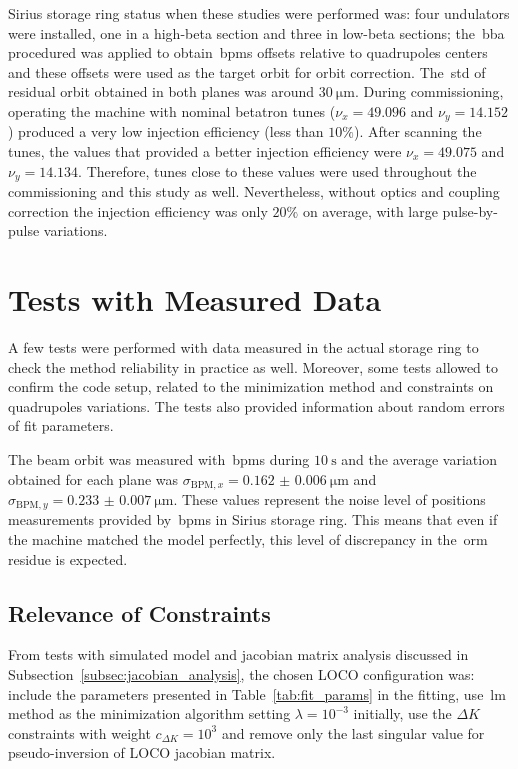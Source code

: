 Sirius storage ring status when these studies were performed was: four undulators were installed, one in a high-beta section and three in low-beta sections; the~\gls{bba} procedured was applied to obtain~\glspl{bpm} offsets relative to quadrupoles centers and these offsets were used as the target orbit for orbit correction. The~\gls{std} of residual orbit obtained in both planes was around $\SI{30}{\micro\meter}$. During commissioning, operating the machine with nominal betatron tunes ($\nu_x = 49.096$ and $\nu_y = 14.152$) produced a very low injection efficiency (less than $10\%$). After scanning the tunes, the values that provided a better injection efficiency were $\nu_x = 49.075$ and $\nu_y = 14.134$. Therefore, tunes close to these values were used throughout the commissioning and this study as well. Nevertheless, without optics and coupling correction the injection efficiency was only $20\%$ on average, with large pulse-by-pulse variations.
\section{Tests with Measured Data}\label{sec:tests_measured}
A few tests were performed with data measured in the actual storage ring to check the method reliability in practice as well. Moreover, some tests allowed to confirm the code setup, related to the minimization method and constraints on quadrupoles variations. The tests also provided information about random errors of fit parameters.

The beam orbit was measured with~\glspl{bpm} during $\SI{10}{\second}$ and the average variation obtained for each plane was $\sigma_{\mathrm{BPM}, x} = \SI{0.162(6)}{\micro\meter}$ and $\sigma_{\mathrm{BPM}, y} = \SI{0.233(7)}{\micro\meter}$. These values represent the noise level of positions measurements provided by~\glspl{bpm} in Sirius storage ring. This means that even if the machine matched the model perfectly, this level of discrepancy in the~\gls{orm} residue is expected.

\subsection{Relevance of Constraints}\label{subsec:loco_config}
From tests with simulated model and jacobian matrix analysis discussed in Subsection~\ref{subsec:jacobian_analysis}, the chosen LOCO configuration was: include the parameters presented in Table~\ref{tab:fit_params} in the fitting, use~\gls{lm} method as the minimization algorithm setting $\lambda = 10^{-3}$ initially, use the $\Delta K$ constraints with weight $c_{\Delta K} = 10^{3}$ and remove only the last singular value for pseudo-inversion of LOCO jacobian matrix. 

